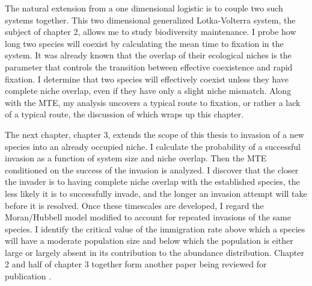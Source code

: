 The natural extension from a one dimensional logistic is to couple two such systems together. 
This two dimensional generalized Lotka-Volterra system, the subject of chapter 2, allows me to study biodiversity maintenance. %
I probe how long two species will coexist by calculating the mean time to fixation in the system. 
It was already known that the overlap of their ecological niches is the parameter that controls the transition between effective coexistence and rapid fixation. 
I determine that two species will effectively coexist unless they have complete niche overlap, even if they have only a slight niche mismatch. %
Along with the MTE, my analysis uncovers a typical route to fixation, or rather a lack of a typical route, the discussion of which wraps up this chapter. %

The next chapter, chapter 3, extends the scope of this thesis to invasion of a new species into an already occupied niche. %
I calculate the probability of a successful invasion as a function of system size and niche overlap. 
Then the MTE conditioned on the success of the invasion is analyzed. 
I discover that the closer the invader is to having complete niche overlap with the established species, the less likely it is to successfully invade, and the longer an invasion attempt will take before it is resolved. %
Once these timescales are developed, I regard the Moran/Hubbell model modified to account for repeated invasions of the same species. 
I identify the critical value of the immigration rate above which a species will have a moderate population size and below which the population is either large or largely absent in its contribution to the abundance distribution. %
Chapter 2 and half of chapter 3 together form another paper being reviewed for publication \cite{Badali2018}. %

